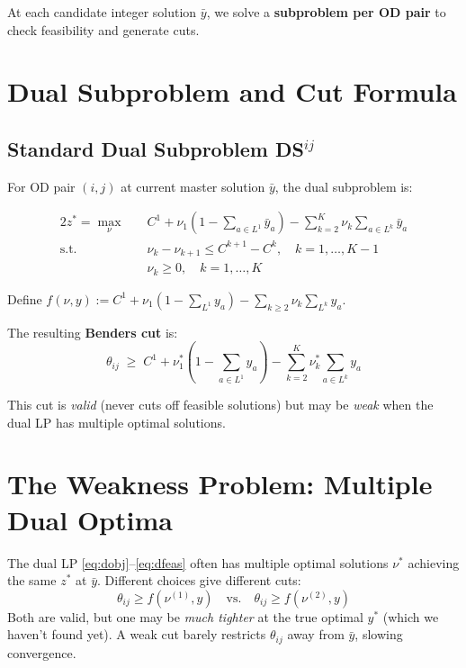 \documentclass[12pt,a4paper]{article}
\begin{document}
At each candidate integer solution $\bar{y}$, we solve a
\textbf{subproblem per OD pair} to check feasibility and generate cuts.

\section{Dual Subproblem and Cut Formula}

\subsection{Standard Dual Subproblem DS$^{ij}$}

For OD pair $(i,j)$ at current master solution $\bar{y}$, the dual
subproblem is:

\begin{tcolorbox}[colback=lightblue,title=\textbf{Dual Subproblem} $\text{DS}^{ij}(\bar{y})$]
\begin{alignat}{2}
z^* = \max_{\nu}\quad & C^1 + \nu_1\!\left(1-\sum_{a\in L^1}\bar{y}_a\right)
      - \sum_{k=2}^{K}\nu_k\sum_{a\in L^k}\bar{y}_a \label{eq:dobj}\\
\text{s.t.}\quad & \nu_k - \nu_{k+1} \le C^{k+1}-C^k, \quad k=1,\ldots,K-1 \label{eq:dfeas}\\
                 & \nu_k \ge 0, \quad k=1,\ldots,K
\end{alignat}
\end{tcolorbox}

Define $f(\nu, y) := C^1 + \nu_1(1-\sum_{L^1}y_a) - \sum_{k\ge 2}\nu_k\sum_{L^k}y_a$.

\medskip
\noindent The resulting \textbf{Benders cut} is:
$$\boxed{\theta_{ij} \;\ge\; C^1 + \nu_1^*\!\left(1 - \sum_{a\in L^1}y_a\right)
  - \sum_{k=2}^{K}\nu_k^*\sum_{a\in L^k}y_a}$$

This cut is \emph{valid} (never cuts off feasible solutions) but may be \emph{weak}
when the dual LP has multiple optimal solutions.

\section{The Weakness Problem: Multiple Dual Optima}

\begin{tcolorbox}[colback=lightyellow,title=\textbf{Why standard cuts can be weak}]
The dual LP \eqref{eq:dobj}--\eqref{eq:dfeas} often has multiple optimal
solutions $\nu^*$ achieving the same $z^*$ at $\bar{y}$.  Different choices give
different cuts:
$$\theta_{ij} \ge f(\nu^{(1)}, y) \quad \text{vs.} \quad \theta_{ij} \ge f(\nu^{(2)}, y)$$
Both are valid, but one may be \emph{much tighter} at the true
optimal $y^*$ (which we haven't found yet).  A weak cut barely restricts $\theta_{ij}$
away from $\bar{y}$, slowing convergence.
\end{tcolorbox}
\end{document}

